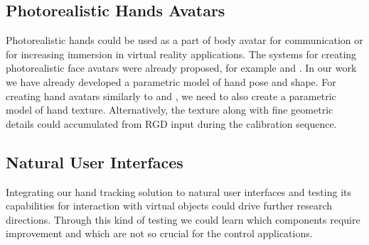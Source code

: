 \subsection*{Photorealistic Hands Avatars}
Photorealistic hands could be used as a part of body avatar for communication or for increasing immersion in virtual reality applications. The systems for creating photorealistic face avatars were already proposed, for example \cite{thies2016face2face} and \cite{tewari2017mofa}. In our work we have already developed a parametric model of hand pose and shape. For creating hand avatars similarly to\cite{thies2016face2face} and \cite{tewari2017mofa}, we need to also create a parametric model of hand texture. Alternatively, the texture along with fine geometric details could accumulated from RGD input during the calibration sequence.

\subsection*{Natural User Interfaces}
Integrating our hand tracking solution to natural user interfaces and testing its capabilities for interaction with virtual objects could drive further research directions. Through this kind of testing we could learn which components require improvement and which are not so crucial for the control applications.
